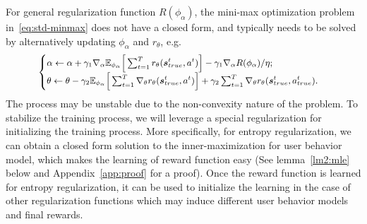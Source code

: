 \documentclass{article} %
\newcommand{\Le}[1]{{\color{red}{\bf\sf [ #1]}}}
\newcommand{\xc}[1]{{\color{blue}{\bf\sf #1}}}
\begin{document}
For general regularization function $R(\phi_\alpha)$, the mini-max optimization problem in~\eqref{eq:std-minmax} does not have a closed form, and typically needs to be solved by alternatively updating $\phi_{\alpha}$ and $r_{\theta}$, e.g. 
\begin{equation}\footnotesize{\begin{cases}\alpha \gets \alpha + \gamma_1\nabla_{\alpha}\E_{\phi_{\alpha}}\Big[\sum_{t=1}^T r_{\theta}(\vs^t_{true}, a^t) \Big]-\gamma_1\nabla_{\alpha}R(\phi_{\alpha})/\eta ;\\
\theta \gets \theta -\gamma_2 \E_{\phi_{\alpha}}\Big[\sum_{t=1}^T \nabla_{\theta} r_{\theta}(\vs^t_{true},a^t)\Big] +\gamma_2 \sum_{t=1}^T \nabla_{\theta} r_{\theta}(\vs^t_{true},a^t_{true}).
\end{cases}}
\end{equation}
The process may be unstable due to the non-convexity nature of the problem. To stabilize the training process, we will leverage a special regularization for initializing the training process. More specifically, for entropy regularization, we can obtain a closed form solution to the inner-maximization for user behavior model, which makes the learning of reward function easy (See lemma~\ref{lm2:mle} below and Appendix~\ref{app:proof} for a proof). Once the reward function is learned for entropy regularization, it can be used to initialize the learning in the case of other regularization functions which may induce different user behavior models and final rewards. 


\end{document}
